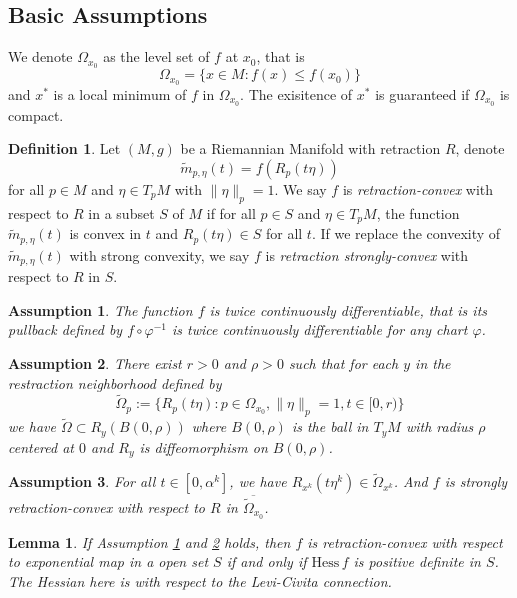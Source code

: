 \documentclass[12pt,a4paper,draft]{article}  %
\newtheorem{lemma}{Lemma}[section]
\newtheorem{assumption}{Assumption}[section]
\theoremstyle{definition}
\newtheorem{definition}{Definition}[section]
\numberwithin{equation}{section}
\newcommand{\hess}{\mathrm{Hess}\,}
\begin{document}
\subsection{Basic Assumptions}
We denote $\Omega_{x_0}$ as the level set of $f$ at $x_0$, that is
\[
\Omega_{x_0} = \{x\in M: f(x) \leq f(x_0)\}
\]
and $x^\ast$ is a local minimum of $f$ in $\Omega_{x_0}$. The exisitence of $x^\ast$ is guaranteed if $\Omega_{x_0}$ is compact. 
\begin{definition}
        Let $(M,g)$ be a Riemannian Manifold with retraction $R$, denote
        \[
        \widetilde{m}_{p,\eta}(t) = f\left(R_p(t\eta)\right)
        \]
        for all $p\in M$ and $\eta \in T_p M$ with $\|\eta\|_p=1$. We say $f$ is \emph{retraction-convex} with respect to $R$ in a subset $S$ of $M$ if for all $p\in S$ and $\eta \in T_p M$, the function $\widetilde{m}_{p,\eta}(t)$ is convex in $t$ and $R_p(t\eta)\in S$ for all $t$. If we replace the convexity of $\widetilde{m}_{p,\eta}(t)$ with strong convexity, we say $f$ is \emph{retraction strongly-convex} with respect to $R$ in $S$.
\end{definition}
\begin{assumption}\label{assumption_1}
        The function $f$ is twice continuously differentiable, that is its pullback defined by $f\circ \varphi^{-1}$ is twice continuously differentiable for any chart $\varphi$. 
\end{assumption}
\begin{assumption}\label{assumption_2}
        There exist $r>0$ and $\rho>0$ such that for each $y$ in the restraction neighborhood defined by
        \[
        \widetilde{\Omega}_p:= \{R_p(t\eta): p\in \Omega_{x_0}, \|\eta\|_p = 1, t\in [0,r)\}
        \]
        we have $\widetilde{\Omega}\subset R_y(B(0,\rho))$ where $B(0,\rho)$ is the ball in $T_y M$ with radius $\rho$ centered at $0$ and $R_y$ is diffeomorphism on $B(0,\rho)$. 
\end{assumption}
\begin{assumption}\label{assumption_3}
        For all $t\in [0,\alpha^k]$, we have $R_{x^k}(t\eta^k)\in \widetilde{\Omega}_{x^k}$. And $f$ is strongly retraction-convex with respect to $R$ in $\overline{\widetilde{\Omega}_{x_0}}$.
\end{assumption}
\begin{lemma}
        If Assumption \ref{assumption_1} and \ref{assumption_2} holds, then $f$ is retraction-convex with respect to exponential map in a open set $S$ if and only if $\hess f$ is positive definite in $S$. The Hessian here is with respect to the Levi-Civita connection.
\end{lemma}
\end{document}
